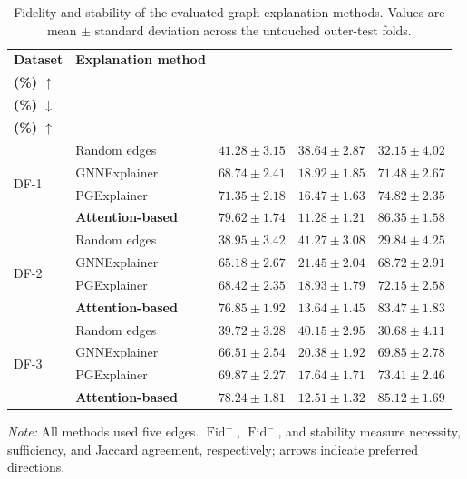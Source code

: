 \documentclass[pdflatex,sn-mathphys-num]{sn-jnl}%
\theoremstyle{thmstyleone}%
\theoremstyle{thmstyletwo}%
\theoremstyle{thmstylethree}%
\begin{document}
\begin{table}[!ht]
\centering
\caption{
Fidelity and stability of the evaluated graph-explanation methods. Values are
mean \(\pm\) standard deviation across the untouched outer-test folds.
}
\label{tab:graph_explanation_comparison}
\small
\setlength{\tabcolsep}{5pt}
\renewcommand{\arraystretch}{1.08}
\begin{tabular}{@{}llccc@{}}
\toprule
\textbf{Dataset} &
\textbf{Explanation method} &
\shortstack{\(\mathbf{Fid^{+}}\)\\\textbf{(\%) \(\uparrow\)}} &
\shortstack{\(\mathbf{Fid^{-}}\)\\\textbf{(\%) \(\downarrow\)}} &
\shortstack{\textbf{Stability}\\\textbf{(\%) \(\uparrow\)}} \\
\midrule

\multirow{4}{*}{DF-1}
& Random edges
& $41.28\pm3.15$ & $38.64\pm2.87$ & $32.15\pm4.02$ \\
& GNNExplainer
& $68.74\pm2.41$ & $18.92\pm1.85$ & $71.48\pm2.67$ \\
& PGExplainer
& $71.35\pm2.18$ & $16.47\pm1.63$ & $74.82\pm2.35$ \\
& \textbf{Attention-based}
& \textbf{$79.62\pm1.74$}
& \textbf{$11.28\pm1.21$}
& \textbf{$86.35\pm1.58$} \\
\midrule

\multirow{4}{*}{DF-2}
& Random edges
& $38.95\pm3.42$ & $41.27\pm3.08$ & $29.84\pm4.25$ \\
& GNNExplainer
& $65.18\pm2.67$ & $21.45\pm2.04$ & $68.72\pm2.91$ \\
& PGExplainer
& $68.42\pm2.35$ & $18.93\pm1.79$ & $72.15\pm2.58$ \\
& \textbf{Attention-based}
& \textbf{$76.85\pm1.92$}
& \textbf{$13.64\pm1.45$}
& \textbf{$83.47\pm1.83$} \\
\midrule

\multirow{4}{*}{DF-3}
& Random edges
& $39.72\pm3.28$ & $40.15\pm2.95$ & $30.68\pm4.11$ \\
& GNNExplainer
& $66.51\pm2.54$ & $20.38\pm1.92$ & $69.85\pm2.78$ \\
& PGExplainer
& $69.87\pm2.27$ & $17.64\pm1.71$ & $73.41\pm2.46$ \\
& \textbf{Attention-based}
& \textbf{$78.24\pm1.81$}
& \textbf{$12.51\pm1.32$}
& \textbf{$85.12\pm1.69$} \\
\bottomrule
\end{tabular}

\vspace{2pt}
\begin{minipage}{0.97\textwidth}
\footnotesize
\textit{Note:} All methods used five edges. \(\operatorname{Fid}^{+}\),
\(\operatorname{Fid}^{-}\), and stability measure necessity, sufficiency, and
Jaccard agreement, respectively; arrows indicate preferred directions.
\end{minipage}
\end{table}
\end{document}
